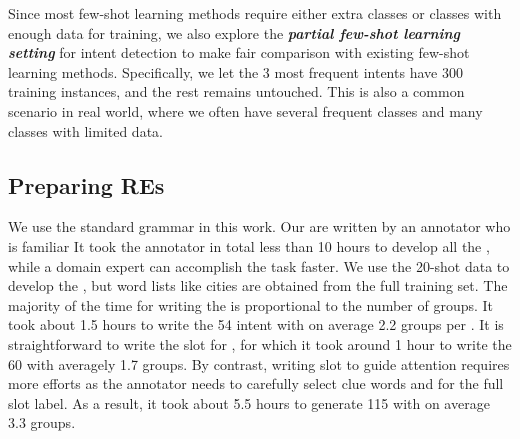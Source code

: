 Since most few-shot learning methods require either extra classes or classes with enough data for training, we also explore the
\textbf{\emph{partial few-shot learning setting}} for intent detection to make fair comparison with existing few-shot learning methods.
Specifically, we let the 3 most frequent intents have 300 training instances, and the rest remains untouched.
This is also a common scenario in real world, where we often have several frequent classes and many classes with limited data.

\subsection{Preparing REs}
\label{re_in_exp} We use the standard \RE grammar in this work. Our \REs are written by an  annotator 
who is familiar 
It took the annotator in total less than 10 hours
to develop all the \REs, while a domain expert can accomplish the task faster. We use the 20-shot data to develop the \REs, but word lists
like cities are obtained from the full training set. The majority of the time 
for %
writing the \REs is proportional to the number of \RE groups. 
It took about 1.5 hours to write the 54 intent \REs with on average 2.2 groups per \RE. It is straightforward
to write the slot \REs for , for which it took around
 1 hour to write the 60 \REs with averagely 1.7 groups. By contrast, writing slot \REs to guide attention requires more
efforts as the annotator needs to carefully select clue words and  for the full slot label. As a result, it took about 
5.5 hours to generate 115 \REs with on average 3.3 groups.


